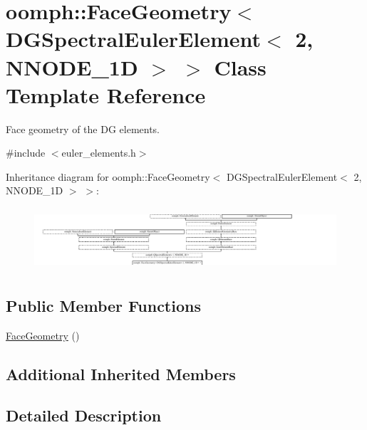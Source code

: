 \hypertarget{classoomph_1_1FaceGeometry_3_01DGSpectralEulerElement_3_012_00_01NNODE__1D_01_4_01_4}{}\section{oomph\+:\+:Face\+Geometry$<$ D\+G\+Spectral\+Euler\+Element$<$ 2, N\+N\+O\+D\+E\+\_\+1D $>$ $>$ Class Template Reference}
\label{classoomph_1_1FaceGeometry_3_01DGSpectralEulerElement_3_012_00_01NNODE__1D_01_4_01_4}


Face geometry of the DG elements.  




{\ttfamily \#include $<$euler\+\_\+elements.\+h$>$}

Inheritance diagram for oomph\+:\+:Face\+Geometry$<$ D\+G\+Spectral\+Euler\+Element$<$ 2, N\+N\+O\+D\+E\+\_\+1D $>$ $>$\+:\begin{figure}[H]
\begin{center}
\leavevmode
\includegraphics[height=2.350120cm]{classoomph_1_1FaceGeometry_3_01DGSpectralEulerElement_3_012_00_01NNODE__1D_01_4_01_4}
\end{center}
\end{figure}
\subsection*{Public Member Functions}
\begin{DoxyCompactItemize}
\item 
\hyperlink{classoomph_1_1FaceGeometry_3_01DGSpectralEulerElement_3_012_00_01NNODE__1D_01_4_01_4_a647070055220d8524ddf70cf77968a1c}{Face\+Geometry} ()
\end{DoxyCompactItemize}
\subsection*{Additional Inherited Members}


\subsection{Detailed Description}
